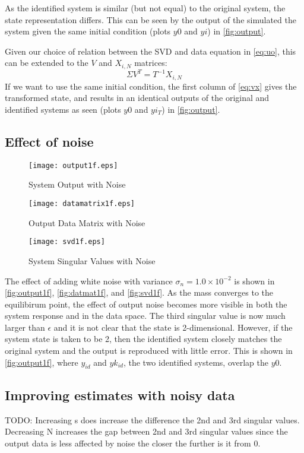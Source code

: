\documentclass[11pt,a4paper]{article}
\begin{document}
As the identified system is similar (but not equal) to the original system, the
state representation differs. This can be seen by the output of the simulated
the system given the same initial condition (plots $y0$ and $yi$) in
\autoref{fig:output}.

Given our choice of relation between the SVD and data equation in
\autoref{eq:uo}, this can be extended to the $V$ and $X_{i, N}$ matrices:
\begin{equation}
    \label{eq:vx}
    \Sigma V^T = T^{-1} X_{i, N}
\end{equation}
If we want to use the same initial condition, the first column of
\autoref{eq:vx} gives the transformed state, and results in an identical
outputs of the original and identified systems as seen (plots $y0$ and $yi_T$)
in \autoref{fig:output}.

\subsection{Effect of noise}
\begin{figure}
    \centering
    \texttt{[image: output1f.eps]}
    \caption{System Output with Noise}
    \label{fig:output1f}
\end{figure}
\begin{figure}
    \centering
    \texttt{[image: datamatrix1f.eps]}
    \caption{Output Data Matrix with Noise}
    \label{fig:datmat1f}
\end{figure}
\begin{figure}
    \centering
    \texttt{[image: svd1f.eps]}
    \caption{System Singular Values with Noise}
    \label{fig:svd1f}
\end{figure}
The effect of adding white noise with variance $\sigma_n = 1.0 \times 10^{-2}$
is shown in \autoref{fig:output1f}, \autoref{fig:datmat1f}, and
\autoref{fig:svd1f}. As the mass converges to the equilibirum point, the effect
of output noise becomes more visible in both the system response and in the
data space. The third singular value is now much larger than $\epsilon$ and it
is not clear that the state is 2-dimensional. However, if the system state is
taken to be 2, then the identified system closely matches the original system
and the output is reproduced with little error. This is shown in
\autoref{fig:output1f}, where $y_{id}$ and $yk_{id}$, the two identified
systems, overlap the $y0$.

\subsection{Improving estimates with noisy data}
TODO: Increasing s does increase the difference the 2nd and 3rd singular
values. Decreasing N increases the gap between 2nd and 3rd singular values
since the output data is less affected by noise the closer the further is it
from 0.
\end{document}
